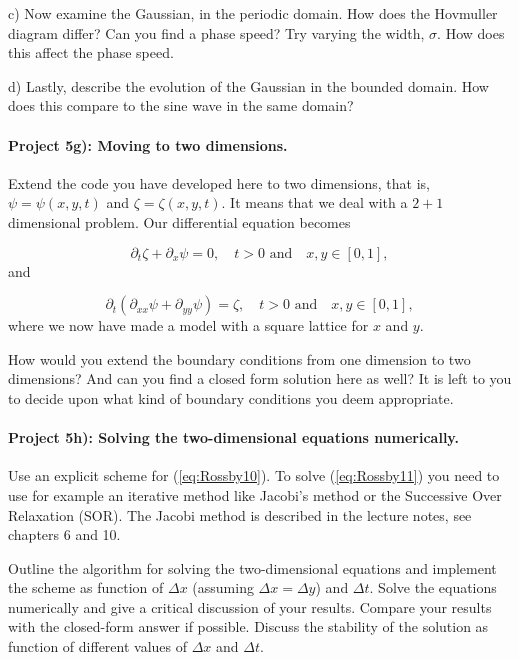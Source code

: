 \documentclass[%
oneside,                 %
final,                   %
10pt]{article}
\begin{document}
c) Now examine the Gaussian, in the periodic domain. How does the
Hovmuller diagram differ? Can you find a phase speed? Try varying
the width, $\sigma$. How does this affect the phase speed.

d) Lastly, describe the evolution of the Gaussian in the bounded
domain. How does this compare to the sine wave in the same domain?


\paragraph{Project 5g): Moving to two dimensions.}
Extend the code you have developed here to two dimensions, that is,
$\psi = \psi(x,y,t)$ and $\zeta = \zeta(x,y,t)$. It means that we deal
with a $2+1$ dimensional problem. Our differential equation becomes

\begin{equation}
  \label{eq:Rossby10}
	\partial_t\zeta + \partial_x\psi = 0, \quad \textrm{$t > 0$ and} \quad x,y\in [0,1],
\end{equation}
and

\begin{equation}
  \label{eq:Rossby11}
	\partial_t\left( \partial_{xx}\psi + \partial_{yy}\psi \right) = \zeta, \quad \textrm{$t > 0$ and} \quad x,y\in [0,1],
\end{equation}
where we now have made a model with a square lattice for $x$ and $y$.

How would you extend the boundary conditions from one dimension to two
dimensions? And can you find a closed form solution here as well?  It
is left to you to decide upon what kind of boundary conditions you
deem appropriate.

\paragraph{Project 5h): Solving the two-dimensional equations numerically.}
Use an explicit scheme for (\ref{eq:Rossby10}). To solve
(\ref{eq:Rossby11}) you need to use for example an iterative method
like Jacobi's method or the Successive Over Relaxation (SOR). The Jacobi method is described in the lecture notes, see chapters 6 and 10.

Outline the algorithm for solving the two-dimensional equations and
implement the scheme as function of $\Delta x$ (assuming $\Delta x =
\Delta y$) and $\Delta t$. Solve the equations numerically and give a
critical discussion of your results. Compare your results with the
closed-form answer if possible. Discuss the stability of the solution
as function of different values of $\Delta x$ and $\Delta t$.
\end{document}
